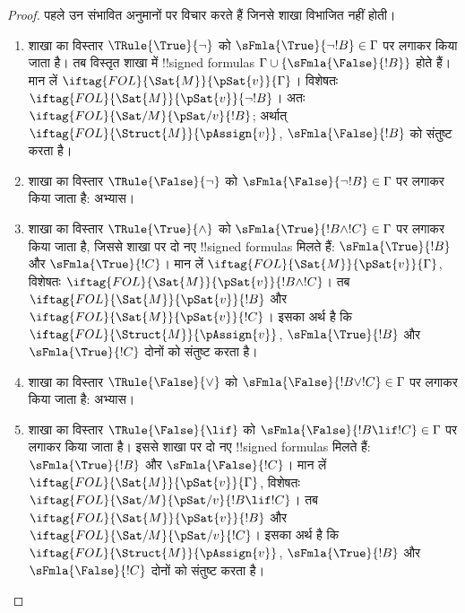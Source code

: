 \documentclass[../../../include/open-logic-section]{subfiles}
\begin{document}
\begin{proof}
पहले उन संभावित अनुमानों पर विचार करते हैं जिनसे शाखा विभाजित नहीं होती।
\begin{enumerate}
\item शाखा का विस्तार $\TRule{\True}{\lnot}$ को
  $\sFmla{\True}{\lnot !B} \in \Gamma$ पर लगाकर किया जाता है। तब विस्तृत
  शाखा में !!{signed formula}s $\Gamma \cup
  \{\sFmla{\False}{!B}\}$ होते हैं।
  मान लें $\iftag{FOL}{\Sat{M}}{\pSat{v}}{\Gamma}$। विशेषतः
  $\iftag{FOL}{\Sat{M}}{\pSat{v}}{\lnot !B}$। अतः
  $\iftag{FOL}{\Sat/{M}}{\pSat/{v}}{!B}$; अर्थात्
  $\iftag{FOL}{\Struct{M}}{\pAssign{v}}$, $\sFmla{\False}{!B}$ को
  संतुष्ट करता है।
\item शाखा का विस्तार $\TRule{\False}{\lnot}$ को
  $\sFmla{\False}{\lnot !B} \in \Gamma$ पर लगाकर किया जाता है: अभ्यास।
\item शाखा का विस्तार $\TRule{\True}{\land}$ को
  $\sFmla{\True}{!B \land !C} \in \Gamma$ पर लगाकर किया जाता है, जिससे शाखा पर दो
  नए !!{signed formula}s मिलते हैं: $\sFmla{\True}{!B}$ और
  $\sFmla{\True}{!C}$। मान लें
  $\iftag{FOL}{\Sat{M}}{\pSat{v}}{\Gamma}$, विशेषतः
  $\iftag{FOL}{\Sat{M}}{\pSat{v}}{!B \land !C}$। तब
  $\iftag{FOL}{\Sat{M}}{\pSat{v}}{!B}$ और
  $\iftag{FOL}{\Sat{M}}{\pSat{v}}{!C}$। इसका अर्थ है कि
  $\iftag{FOL}{\Struct{M}}{\pAssign{v}}$, $\sFmla{\True}{!B}$ और
  $\sFmla{\True}{!C}$ दोनों को संतुष्ट करता है।
\item शाखा का विस्तार $\TRule{\False}{\lor}$ को
  $\sFmla{\False}{!B \lor !C} \in \Gamma$ पर लगाकर किया जाता है: अभ्यास।
\item शाखा का विस्तार $\TRule{\False}{\lif}$ को
  $\sFmla{\False}{!B \lif !C} \in \Gamma$ पर लगाकर किया जाता है। इससे शाखा पर दो
  नए !!{signed formula}s मिलते हैं: $\sFmla{\True}{!B}$ और
  $\sFmla{\False}{!C}$। मान लें
  $\iftag{FOL}{\Sat{M}}{\pSat{v}}{\Gamma}$, विशेषतः
  $\iftag{FOL}{\Sat/{M}}{\pSat/{v}}{!B \lif !C}$। तब
  $\iftag{FOL}{\Sat{M}}{\pSat{v}}{!B}$ और
  $\iftag{FOL}{\Sat/{M}}{\pSat/{v}}{!C}$। इसका अर्थ है कि
  $\iftag{FOL}{\Struct{M}}{\pAssign{v}}$, $\sFmla{\True}{!B}$ और
  $\sFmla{\False}{!C}$ दोनों को संतुष्ट करता है।

\end{enumerate}
\end{proof}
\end{document}

